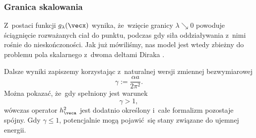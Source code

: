 \documentclass[10pt,t]{beamer}
\begin{document}
\begin{frame}
  \frametitle{Granica skalowania}


  Z~postaci funkcji $g_{ \lambda }( \vecx )$ wynika, że~wzięcie granicy $\lambda \searrow 0$
  powoduje ściągnięcie rozważanych ciał do punktu, podczas gdy siła
  oddziaływania z~nimi rośnie do nieskończoności. Jak już mówiliśmy, nas
  model jest wtedy zbieżny do problemu pola skalarnego z~dwoma deltami
  Diraka
  \parencite{Albeverio-et-al-Solvable-Models-in-Quantum-Mechanics-Pub-1988}.

  Dalsze wyniki zapiszemy korzystając z~naturalnej wersji zmiennej
  bezwymiarowej
  \begin{equation}
    \label{eq:Pole-skalarne-ETC-07}
    \gamma := \frac{ \alpha a }{ 2 \pi^{ 2 } }.
  \end{equation}
  Można pokazać, że~gdy spełniony jest warunek
  \begin{equation}
    \label{eq:Pole-skalarne-08}
    \gamma > 1,
  \end{equation}
  wówczas operator $h_{ \veca }^{ 2 }$ jest dodatnio określony i~całe
  formalizm pozostaje spójny. Gdy $\gamma \leq 1$, potencjalnie mogą pojawić~się
  stany związane do ujemnej energii.

\end{frame}
\end{document}

